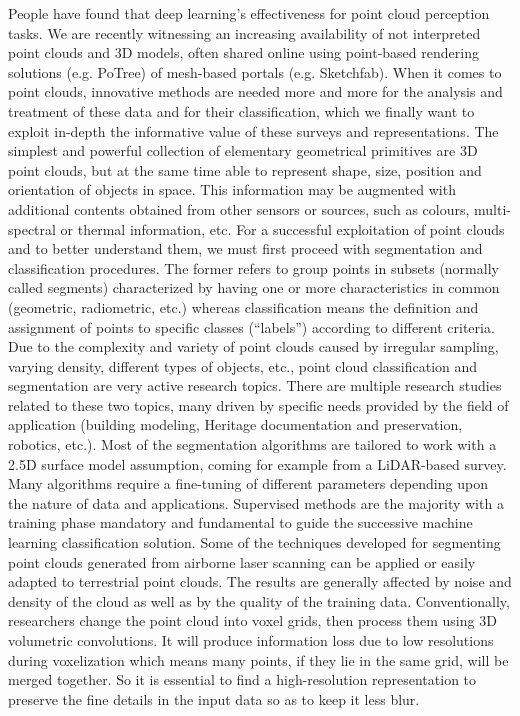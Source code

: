 \documentclass[final]{cvpr}
\begin{document}
People have found that deep learning’s effectiveness for point cloud perception tasks. We are recently witnessing an increasing availability of not interpreted point clouds and 3D models, often shared online using point-based rendering solutions (e.g. PoTree) of mesh-based portals (e.g. Sketchfab). When it comes to point clouds, innovative methods are needed more and more for the analysis and treatment of these data and for their classification, which we finally want to exploit in-depth the informative value of these surveys and representations. The simplest and powerful collection of elementary geometrical primitives are 3D point clouds, but at the same time  able to represent shape, size, position and orientation of objects in space\cite{Zhang2018}. This information may be augmented with additional contents obtained from other sensors or sources, such as colours, multi-spectral or thermal information, etc. For a successful exploitation of point clouds and to better understand them, we must first proceed with segmentation and classification procedures. The former refers to group points in subsets (normally called segments) characterized by having one or more characteristics in common (geometric, radiometric, etc.) whereas classification means the definition and assignment of points to specific classes (“labels”) according to different criteria. Due to the complexity and variety of point clouds caused by irregular sampling, varying density, different types of objects, etc., point cloud classification and segmentation are very active research topics\cite{Weinmann2016Reconstruction}. There are multiple research studies related to these two topics, many driven by specific needs provided by the field of application (building modeling, Heritage documentation and preservation, robotics, etc.). Most of the segmentation algorithms are tailored to work with a 2.5D surface model assumption, coming for example from a LiDAR-based survey\cite{2017A}. Many algorithms require a fine-tuning of different parameters depending upon the nature of data and applications. Supervised methods are the majority with a training phase mandatory and fundamental to guide the successive machine learning classification solution. Some of the techniques developed for segmenting point clouds generated from airborne laser scanning can be applied or easily adapted to terrestrial point clouds. The results are generally affected by noise and density of the cloud as well as by the quality of the training data\cite{2017A}.
Conventionally, researchers change the point cloud into voxel grids, then process them using 3D volumetric convolutions. It will produce information loss due to low resolutions during voxelization which means many points, if they lie in the same grid, will be merged together. So it is essential to find a high-resolution representation to preserve the fine details in the input data so as to keep it less blur. 
\end{document}
